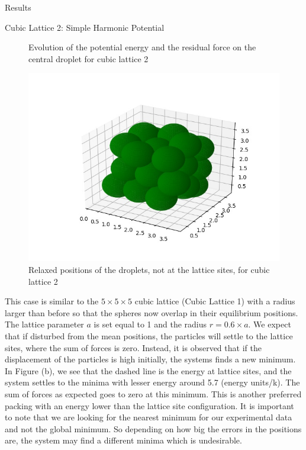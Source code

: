 \documentclass[12pt]{article}
\begin{document}
\begin{section}{Results}
\begin{subsection}{Cubic Lattice 2: Simple Harmonic Potential}
\begin{figure}[h!]
    \caption{Evolution of the potential energy and the residual force on the central droplet for cubic lattice 2}
\end{figure}
\begin{figure}[h!]
    \centering
    \includegraphics[width = 0.5\linewidth]{images/5x5x5_relaxed_r6.jpg}
    \caption{Relaxed positions of the droplets, not at the lattice sites, for cubic lattice 2}
    \label{fig:my_label}
\end{figure}
\noindent This case is similar to the $5 \times 5 \times 5$ cubic lattice (Cubic Lattice 1) with a radius larger than before so that the spheres now overlap in their equilibrium positions. The lattice parameter $a$ is set equal to 1 and the radius $r =0.6 \times a$. We expect that if disturbed from the mean positions, the particles will settle to the lattice sites, where the sum of forces is zero. Instead, it is observed that if the displacement of the particles is high initially, the systems finds a new minimum. In Figure (b), we see that the dashed line is the energy at lattice sites, and the system settles to the minima with lesser energy around 5.7 (energy units/k). The sum of forces as expected goes to zero at this minimum. This is another preferred packing with an energy lower than the lattice site configuration. It is important to note that we are looking for the nearest minimum  for our experimental data and not the global minimum. So depending on how big the errors in the positions are, the system may find a different minima which is undesirable. 
\end{subsection}


\end{section}
\end{document}
